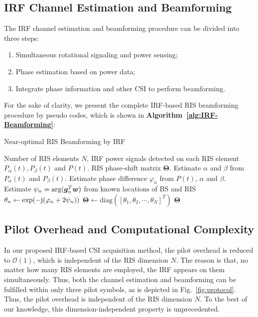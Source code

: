 \documentclass[conference,10pt,twocolumn]{IEEEtran}
\theoremstyle{nonumberplain}
\def \diag {\text{diag}}
\def \exp {\text{exp}}
\begin{document}
\subsection{IRF Channel Estimation and Beamforming} \label{IRF Channel Estimation and Beamforming}
    The \ac{IRF} channel estimation and beamforming procedure can be divided into three steps:
    \begin{enumerate}
        \item Simultaneous rotational signaling and power sensing; 
        \item Phase estimation based on power data;
        \item Integrate phase information and other CSI to perform beamforming. 
    \end{enumerate} 
    For the sake of clarity, we present the complete IRF-based RIS beamforming procedure by pseudo codes, which is shown in {\bf Algorithm~\ref{alg:IRF-Beamforming}}:
    \begin{algorithm}[H] 
        \caption{Near-optimal RIS Beamforming by IRF} \label{alg:IRF-Beamforming}
        \begin{algorithmic}[1]
            \REQUIRE Number of RIS elements $N$, IRF power signals detected on each RIS element $P_{\alpha}(t), P_{\beta}(t)$ and $P(t)$.
            \ENSURE RIS phase-shift matrix ${\bm \Theta}$.
                \STATE Estimate $\alpha$ and $\beta$ from $P_{\alpha}(t)$ and $P_{\beta}(t)$.
                \STATE Estimate phase difference $\varphi_n$ from $P(t)$, $\alpha$ and $\beta$. 
                \STATE Estimate $\psi_{n} = {\rm arg}(\bm g_{n}^{T}\bm w)$ from known locations of BS and RIS
                \STATE $\theta_n \leftarrow \exp(-{\rm j}(\varphi_n + 2\psi_n))$
            \ENDFOR
            \STATE ${\bm \Theta} \leftarrow \diag\left(\left[\theta_1, \theta_2, \cdots, \theta_N\right]^{T}\right)$
            \RETURN ${\bm \Theta}$
        \end{algorithmic}
    \end{algorithm}

\subsection{Pilot Overhead and Computational Complexity}\label{Pilot Overhead}
    In our proposed IRF-based CSI acquisition method, the pilot overhead is reduced to $\mathcal{O}(1)$, which is independent of the RIS dimension $N$. 
    The reason is that, no matter how many RIS elements are employed, the IRF appears on them simultaneously. 
    Thus, both the channel estimation and beamforming can be fulfilled within only three pilot symbols, as is depicted in Fig.~\ref{fig:protocol}. 
    Thus, the pilot overhead is independent of the RIS dimension $N$. 
    To the best of our knowledge, this dimension-independent property is unprecedented. 
    
\end{document}
